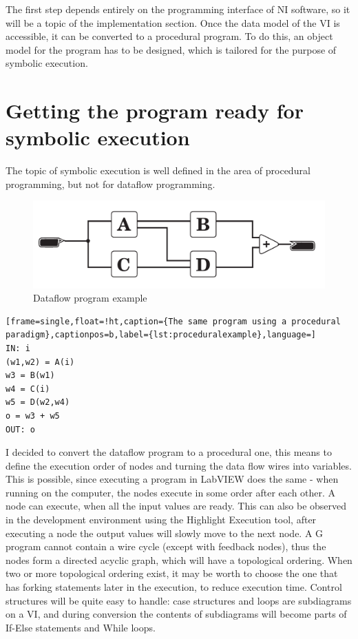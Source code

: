 The first step depends entirely on the programming interface of NI software, so it will be a topic of the implementation section. Once the data model of the VI is accessible, it can be converted to a procedural program. To do this, an object model for the program has to be designed, which is tailored for the purpose of symbolic execution.

\section{Getting the program ready for symbolic execution}

The topic of symbolic execution is well defined in the area of procedural programming, but not for dataflow programming.

\begin{figure}
\includegraphics[width=150mm,keepaspectratio]{figures/vi1.pdf}
\caption{Dataflow program example} 
\label{fig:dataflowexample}
\end{figure}

\begin{lstlisting}[frame=single,float=!ht,caption={The same program using a procedural paradigm},captionpos=b,label={lst:proceduralexample},language=]
IN: i
(w1,w2) = A(i)
w3 = B(w1)
w4 = C(i)
w5 = D(w2,w4)
o = w3 + w5
OUT: o
\end{lstlisting}

I decided to convert the dataflow program to a procedural one, this means to define the execution order of nodes and turning the data flow wires into variables. This is possible, since executing a program in LabVIEW does the same - when running on the computer, the nodes execute in some order after each other. A node can execute, when all the input values are ready. This can also be observed in the development environment using the Highlight Execution tool, after executing a node the output values will slowly move to the next node. A G program cannot contain a wire cycle (except with feedback nodes), thus the nodes form a directed acyclic graph, which will have a topological ordering. When two or more topological ordering exist, it may be worth to choose the one that has forking statements later in the execution, to reduce execution time. Control structures will be quite easy to handle: case structures and loops are subdiagrams on a VI, and during conversion the contents of subdiagrams will become parts of If-Else statements and While loops. 
